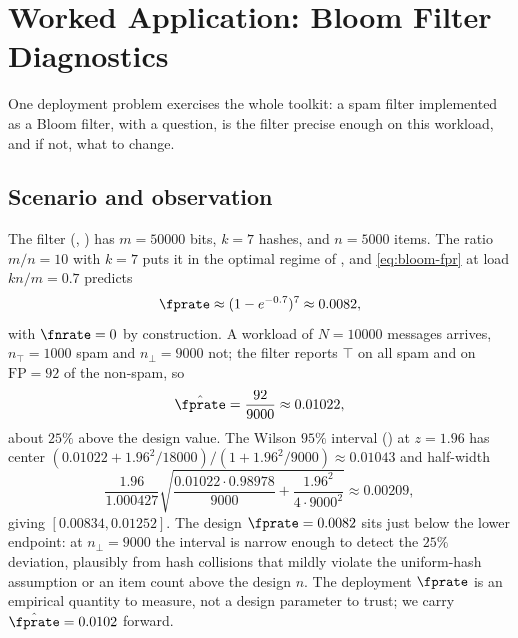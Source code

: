 %

\section{Worked Application: Bloom Filter Diagnostics}
\label{sec:bloom-diagnostics}

One deployment problem exercises the whole toolkit: a spam filter implemented
as a Bloom filter, with a question, is the filter precise enough on this
workload, and if not, what to change.

\subsection*{Scenario and observation}

The filter (, ) has
$m = 50000$ bits, $k = 7$ hashes, and $n = 5000$ items. The ratio $m/n = 10$
with $k = 7$ puts it in the optimal regime of , and
\eqref{eq:bloom-fpr} at load $kn/m = 0.7$ predicts
\[
  \fprate \approx (1 - e^{-0.7})^7 \approx 0.0082,
\]
with $\fnrate = 0$ by construction. A workload of $N = 10000$ messages arrives,
$n_\top = 1000$ spam and $n_\bot = 9000$ not; the filter reports $\top$ on all
spam and on $\mathrm{FP} = 92$ of the non-spam, so
\[
  \hat{\fprate} = \frac{92}{9000} \approx 0.01022,
\]
about $25\%$ above the design value. The Wilson $95\%$ interval
() at $z = 1.96$ has center
$(0.01022 + 1.96^2/18000)/(1 + 1.96^2/9000) \approx 0.01043$ and half-width
\[
  \frac{1.96}{1.000427}\sqrt{\frac{0.01022 \cdot 0.98978}{9000}
    + \frac{1.96^2}{4 \cdot 9000^2}} \approx 0.00209,
\]
giving $[0.00834, 0.01252]$. The design $\fprate = 0.0082$ sits just below the
lower endpoint: at $n_\bot = 9000$ the interval is narrow enough to detect the
$25\%$ deviation, plausibly from hash collisions that mildly violate the
uniform-hash assumption or an item count above the design $n$. The deployment
$\fprate$ is an empirical quantity to measure, not a design parameter to
trust; we carry $\hat{\fprate} = 0.0102$ forward.

